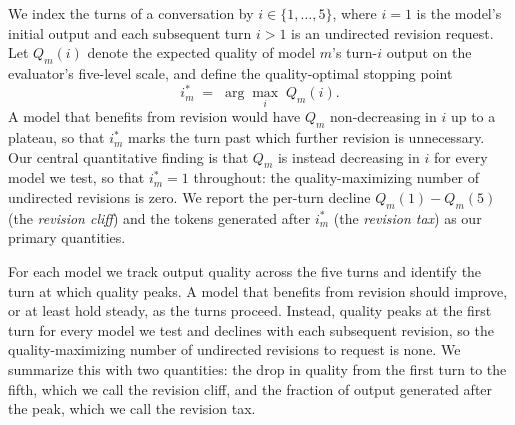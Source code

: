 
We index the turns of a conversation by $i \in \{1, \dots, 5\}$, where $i = 1$ is the model's
initial output and each subsequent turn $i > 1$ is an undirected revision request. Let $Q_m(i)$
denote the expected quality of model $m$'s turn-$i$ output on the evaluator's five-level scale, and
define the quality-optimal stopping point
\[
  i^{*}_m \;=\; \arg\max_{i} \; Q_m(i).
\]
A model that benefits from revision would have $Q_m$ non-decreasing in $i$ up to a plateau, so that
$i^{*}_m$ marks the turn past which further revision is unnecessary. Our central quantitative finding
is that $Q_m$ is instead decreasing in $i$ for every model we test, so that $i^{*}_m = 1$ throughout:
the quality-maximizing number of undirected revisions is zero. We report the per-turn decline
$Q_m(1) - Q_m(5)$ (the \emph{revision cliff}) and the tokens generated after $i^{*}_m$ (the
\emph{revision tax}) as our primary quantities.

For each model we track output quality across the five turns and identify the turn at which quality
peaks. A model that benefits from revision should improve, or at least hold steady, as the turns
proceed. Instead, quality peaks at the first turn for every model we test and declines with each
subsequent revision, so the quality-maximizing number of undirected revisions to request is none. We
summarize this with two quantities: the drop in quality from the first turn to the fifth, which we
call the revision cliff, and the fraction of output generated after the peak, which we call the
revision tax.
